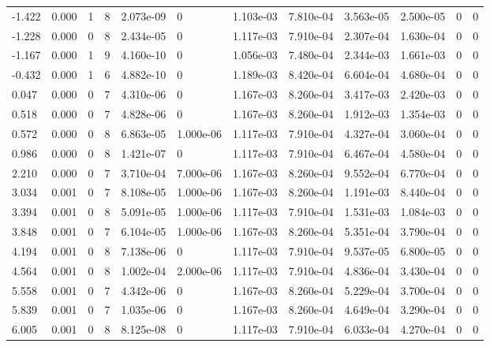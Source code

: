 \documentclass[preview]{standalone}
\begin{document}
{{\begin{tabular}{L{1.2cm}C{1.2cm} C{0.3cm}C{0.5cm} C{1.4cm}C{1.4cm} C{1.4cm}C{1.4cm} C{1.6cm}C{1.6cm} C{1.6cm}C{1.6cm}}
  -1.422  &  0.000  & 1     &  8 &  2.073e-09  & 0  &  1.103e-03&   7.810e-04& 3.563e-05 & 2.500e-05   &  0 & 0  \\ 
  -1.228  &  0.000  & 0     &  8 &  2.434e-05  & 0  &  1.117e-03&   7.910e-04& 2.307e-04 & 1.630e-04   &  0 & 0  \\ 
  -1.167  &  0.000  & 1     &  9 &  4.160e-10  & 0  &  1.056e-03&   7.480e-04& 2.344e-03 & 1.661e-03   &  0 & 0  \\ 
  -0.432  &  0.000  & 1     &  6 &  4.882e-10  & 0  &  1.189e-03&   8.420e-04& 6.604e-04 & 4.680e-04   &  0 & 0  \\ 
  0.047  &  0.000  & 0     &  7 &  4.310e-06  & 0  &  1.167e-03&   8.260e-04& 3.417e-03 & 2.420e-03   &  0 & 0  \\ 
  0.518  &  0.000  & 0     &  7 &  4.828e-06  & 0  &  1.167e-03&   8.260e-04& 1.912e-03 & 1.354e-03   &  0 & 0  \\ 
  0.572  &  0.000  & 0     &  8 &  6.863e-05  & 1.000e-06  &  1.117e-03&   7.910e-04& 4.327e-04 & 3.060e-04   &  0 & 0  \\ 
  0.986  &  0.000  & 0     &  8 &  1.421e-07  & 0  &  1.117e-03&   7.910e-04& 6.467e-04 & 4.580e-04   &  0 & 0  \\ 
  2.210  &  0.000  & 0     &  7 &  3.710e-04  & 7.000e-06  &  1.167e-03&   8.260e-04& 9.552e-04 & 6.770e-04   &  0 & 0  \\ 
  3.034  &  0.001  & 0     &  7 &  8.108e-05  & 1.000e-06  &  1.167e-03&   8.260e-04& 1.191e-03 & 8.440e-04   &  0 & 0  \\ 
  3.394  &  0.001  & 0     &  8 &  5.091e-05  & 1.000e-06  &  1.117e-03&   7.910e-04& 1.531e-03 & 1.084e-03   &  0 & 0  \\ 
  3.848  &  0.001  & 0     &  7 &  6.104e-05  & 1.000e-06  &  1.167e-03&   8.260e-04& 5.351e-04 & 3.790e-04   &  0 & 0  \\ 
  4.194  &  0.001  & 0     &  8 &  7.138e-06  & 0  &  1.117e-03&   7.910e-04& 9.537e-05 & 6.800e-05   &  0 & 0  \\ 
  4.564  &  0.001  & 0     &  8 &  1.002e-04  & 2.000e-06  &  1.117e-03&   7.910e-04& 4.836e-04 & 3.430e-04   &  0 & 0  \\ 
  5.558  &  0.001  & 0     &  7 &  4.342e-06  & 0  &  1.167e-03&   8.260e-04& 5.229e-04 & 3.700e-04   &  0 & 0  \\ 
  5.839  &  0.001  & 0     &  7 &  1.035e-06  & 0  &  1.167e-03&   8.260e-04& 4.649e-04 & 3.290e-04   &  0 & 0  \\ 
  6.005  &  0.001  & 0     &  8 &  8.125e-08  & 0  &  1.117e-03&   7.910e-04& 6.033e-04 & 4.270e-04   &  0 & 0  \\ 

\end{tabular}}}
\end{document}
